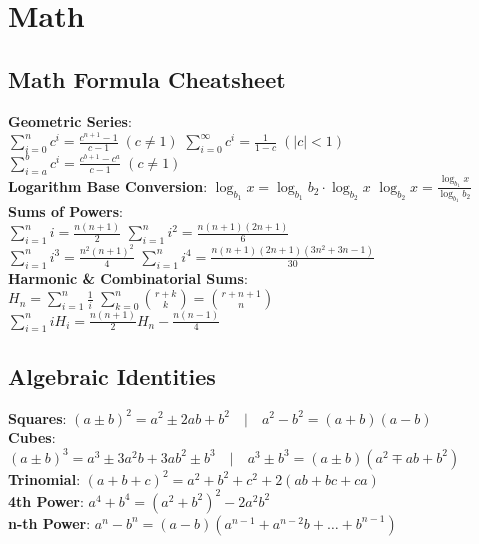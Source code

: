 \section{Math}
\subsection{Math Formula Cheatsheet}
\textbf{Geometric Series}: \\
\textbullet{} $\sum_{i=0}^n c^i = \frac{c^{n+1}-1}{c-1} \; (c \neq 1)$ \hfill $\sum_{i=0}^\infty c^i = \frac{1}{1-c} \; (|c| < 1)$ \\
\textbullet{} $\sum_{i=a}^b c^i = \frac{c^{b+1} - c^a}{c - 1} \; (c \neq 1)$ \\
\textbf{Logarithm Base Conversion}: $\log_{b_1} x = \log_{b_1} b_2 \cdot \log_{b_2} x$ \hfill $\log_{b_2} x = \frac{\log_{b_1} x}{\log_{b_1} b_2}$ \\
\textbf{Sums of Powers}: \\
\textbullet{} $\sum_{i=1}^n i = \frac{n(n+1)}{2}$ \hfill $\sum_{i=1}^n i^2 = \frac{n(n+1)(2n+1)}{6}$ \\
\textbullet{} $\sum_{i=1}^n i^3 = \frac{n^2(n+1)^2}{4}$ \hfill $\sum_{i=1}^n i^4 = \frac{n(n+1)(2n+1)(3n^2+3n-1)}{30}$ \\
\textbf{Harmonic \& Combinatorial Sums}: \\
\textbullet{} $H_n = \sum_{i=1}^n \frac{1}{i}$ \hfill $\sum_{k=0}^n \binom{r+k}{k} = \binom{r+n+1}{n}$ \\
\textbullet{} $\sum_{i=1}^n i H_i = \frac{n(n+1)}{2} H_n - \frac{n(n-1)}{4}$

\subsection{Algebraic Identities}
\textbf{Squares}: $(a \pm b)^2 = a^2 \pm 2ab + b^2 \quad | \quad a^2 - b^2 = (a + b)(a - b)$ \\
\textbf{Cubes}: $(a \pm b)^3 = a^3 \pm 3a^2 b + 3ab^2 \pm b^3 \quad | \quad a^3 \pm b^3 = (a \pm b)(a^2 \mp ab + b^2)$ \\
\textbf{Trinomial}: $(a + b + c)^2 = a^2 + b^2 + c^2 + 2(ab + bc + ca)$ \\
\textbf{4th Power}: $a^4 + b^4 = (a^2 + b^2)^2 - 2a^2 b^2$ \\
\textbf{n-th Power}: $a^n - b^n = (a - b)(a^{n-1} + a^{n-2} b + \dots + b^{n-1})$

